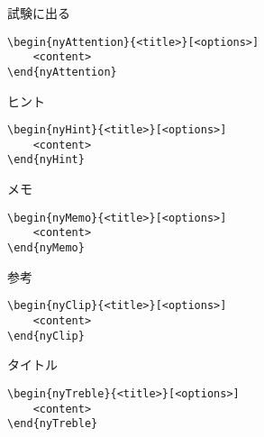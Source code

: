 \documentclass[xelatex,ja=standard,b5j,8pt,magstyle=nomag*,japaram={units}]{bxjsarticle}
\begin{document}
\begin{multicols}{2}
\begin{nyAttention}{試験に出る}
\end{nyAttention}
\columnbreak
\begin{lstlisting}
\begin{nyAttention}{<title>}[<options>]
    <content>
\end{nyAttention}
\end{lstlisting}
\end{multicols}

\begin{multicols}{2}
\begin{nyHint}{ヒント}
\end{nyHint}
\columnbreak
\begin{lstlisting}
\begin{nyHint}{<title>}[<options>]
    <content>
\end{nyHint}
\end{lstlisting}
\end{multicols}

\begin{multicols}{2}
\begin{nyMemo}{メモ}
\end{nyMemo}
\columnbreak
\begin{lstlisting}
\begin{nyMemo}{<title>}[<options>]
    <content>
\end{nyMemo}
\end{lstlisting}
\end{multicols}

\begin{multicols}{2}
\begin{nyClip}{参考}
\end{nyClip}
\columnbreak
\begin{lstlisting}
\begin{nyClip}{<title>}[<options>]
    <content>
\end{nyClip}
\end{lstlisting}
\end{multicols}

\begin{multicols}{2}
\begin{nyTreble}{タイトル}
\end{nyTreble}
\columnbreak
\begin{lstlisting}
\begin{nyTreble}{<title>}[<options>]
    <content>
\end{nyTreble}
\end{lstlisting}
\end{multicols}
\end{document}
